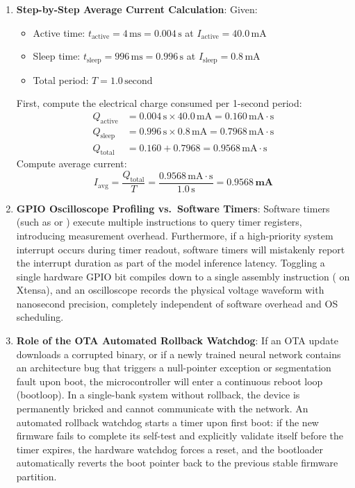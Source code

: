\begin{enumerate}
    \item \textbf{Step-by-Step Average Current Calculation}:
    Given:
    \begin{itemize}
        \item Active time: $t_{\text{active}} = 4\,\text{ms} = 0.004\,\text{s}$ at $I_{\text{active}} = 40.0\,\text{mA}$
        \item Sleep time: $t_{\text{sleep}} = 996\,\text{ms} = 0.996\,\text{s}$ at $I_{\text{sleep}} = 0.8\,\text{mA}$
        \item Total period: $T = 1.0\,\text{second}$
    \end{itemize}
    First, compute the electrical charge consumed per 1-second period:
    \begin{align*}
    Q_{\text{active}} &= 0.004\,\text{s} \times 40.0\,\text{mA} = 0.160\,\text{mA}\cdot\text{s}\\
    Q_{\text{sleep}}  &= 0.996\,\text{s} \times 0.8\,\text{mA} = 0.7968\,\text{mA}\cdot\text{s}\\
    Q_{\text{total}}  &= 0.160 + 0.7968 = 0.9568\,\text{mA}\cdot\text{s}
    \end{align*}
    Compute average current:
    \begin{equation*}
    I_{\text{avg}} = \frac{Q_{\text{total}}}{T} = \frac{0.9568\,\text{mA}\cdot\text{s}}{1.0\,\text{s}} = \mathbf{0.9568\,\text{mA}}
    \end{equation*}

    \item \textbf{GPIO Oscilloscope Profiling vs.\ Software Timers}:
    Software timers (such as  or ) execute multiple instructions to query timer registers, introducing measurement overhead. Furthermore, if a high-priority system interrupt occurs during timer readout, software timers will mistakenly report the interrupt duration as part of the model inference latency. Toggling a single hardware GPIO bit compiles down to a single assembly instruction ( on Xtensa), and an oscilloscope records the physical voltage waveform with nanosecond precision, completely independent of software overhead and OS scheduling.

    \item \textbf{Role of the OTA Automated Rollback Watchdog}:
    If an OTA update downloads a corrupted binary, or if a newly trained neural network contains an architecture bug that triggers a null-pointer exception or segmentation fault upon boot, the microcontroller will enter a continuous reboot loop (bootloop). In a single-bank system without rollback, the device is permanently bricked and cannot communicate with the network. An automated rollback watchdog starts a timer upon first boot: if the new firmware fails to complete its self-test and explicitly validate itself before the timer expires, the hardware watchdog forces a reset, and the bootloader automatically reverts the boot pointer back to the previous stable firmware partition.


\end{enumerate}
